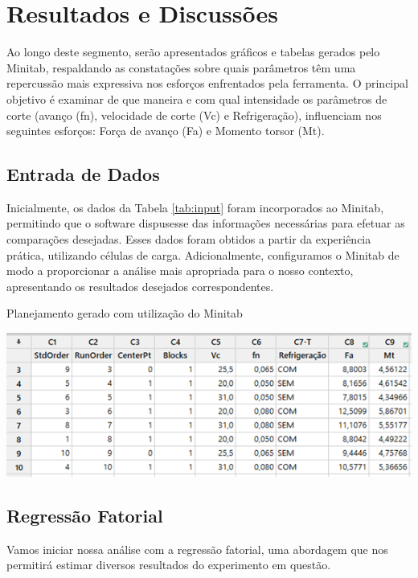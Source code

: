 \documentclass[deposito, acronym, symbols]{fei}
\begin{document}
\chapter{Resultados e Discussões}

Ao longo deste segmento, serão apresentados gráficos e tabelas gerados pelo Minitab, respaldando as constatações sobre quais parâmetros têm uma repercussão mais expressiva nos esforços enfrentados pela ferramenta. O principal objetivo é examinar de que maneira e com qual intensidade os parâmetros de corte (avanço (fn), velocidade de corte (Vc) e Refrigeração), influenciam nos seguintes esforços: Força de avanço (Fa) e Momento torsor (Mt).

\section{Entrada de Dados}

Inicialmente, os dados da Tabela \ref{tab:input} foram incorporados ao Minitab, permitindo que o software dispusesse das informações necessárias para efetuar as comparações desejadas. Esses dados foram obtidos a partir da experiência prática, utilizando células de carga. Adicionalmente, configuramos o Minitab de modo a proporcionar a análise mais apropriada para o nosso contexto, apresentando os resultados desejados correspondentes.

\begin{table}[!htb]
 \centering
    \caption{Planejamento gerado com utilização do Minitab}
    \includegraphics[width=0.8\linewidth]{Imagens/input furação.png}
    \label{tab:input}
 \end{table}

 \section{Regressão Fatorial} \label{regressao}

 Vamos iniciar nossa análise com a regressão fatorial, uma abordagem que nos permitirá estimar diversos resultados do experimento em questão.
 
\end{document}
